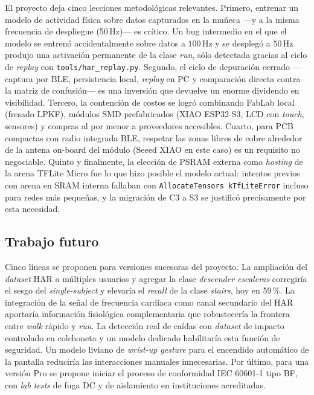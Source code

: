 \documentclass[letterpaper,11pt]{article}
\begin{document}
El proyecto deja cinco lecciones metodol\'ogicas relevantes. Primero, entrenar un modelo de actividad f\'isica sobre datos capturados en la mu\~neca ---y a la misma frecuencia de despliegue (50\,Hz)--- es cr\'itico. Un bug intermedio en el que el modelo se entren\'o accidentalmente sobre datos a $100$\,Hz y se despleg\'o a $50$\,Hz produjo una activaci\'on permanente de la clase \textit{run}, s\'olo detectada gracias al ciclo de \textit{replay} con \texttt{tools/har\_replay.py}. Segundo, el ciclo de depuraci\'on cerrado ---captura por BLE, persistencia local, \textit{replay} en PC y comparaci\'on directa contra la matriz de confusi\'on--- es una inversi\'on que devuelve un enorme dividendo en visibilidad. Tercero, la contenci\'on de costos se logr\'o combinando FabLab local (fresado LPKF), m\'odulos SMD prefabricados (XIAO ESP32-S3, LCD con \textit{touch}, sensores) y compras al por menor a proveedores accesibles. Cuarto, para PCB compactas con radio integrada BLE, respetar las zonas libres de cobre alrededor de la antena on-board del m\'odulo (Seeed XIAO en este caso) es un requisito no negociable. Quinto y finalmente, la elecci\'on de PSRAM externa como \textit{hosting} de la arena TFLite Micro fue lo que hizo posible el modelo actual: intentos previos con arena en SRAM interna fallaban con \texttt{AllocateTensors kTfLiteError} incluso para redes m\'as peque\~nas, y la migraci\'on de C3 a S3 se justific\'o precisamente por esta necesidad.

\subsection{Trabajo futuro}

Cinco l\'ineas se proponen para versiones sucesoras del proyecto. La ampliaci\'on del \textit{dataset} HAR a m\'ultiples usuarios y agregar la clase \textit{descender escaleras} corregir\'ia el sesgo del \textit{single-subject} y elevar\'ia el \textit{recall} de la clase \textit{stairs}, hoy en 59\,\%. La integraci\'on de la se\~nal de frecuencia card\'iaca como canal secundario del HAR aportar\'ia informaci\'on fisiol\'ogica complementaria que robustecer\'ia la frontera entre \textit{walk} r\'apido y \textit{run}. La detecci\'on real de ca\'idas con \textit{dataset} de impacto controlado en colchoneta y un modelo dedicado hab\'ilitar\'ia esta funci\'on de seguridad. Un modelo liviano de \textit{wrist-up gesture} para el encendido autom\'atico de la pantalla reducir\'ia las interacciones manuales innecesarias. Por \'ultimo, para una versi\'on Pro se propone iniciar el proceso de conformidad IEC 60601-1 tipo BF, con \textit{lab tests} de fuga DC y de aislamiento en instituciones acreditadas.
\end{document}
